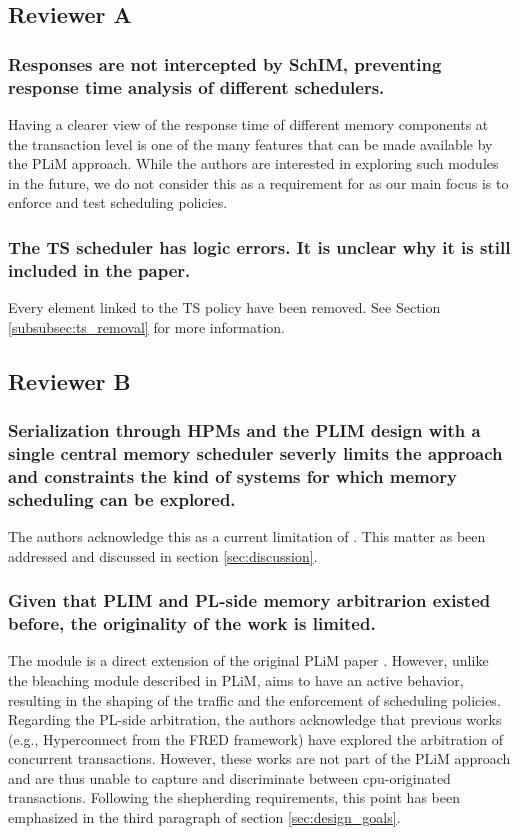     \subsection{Reviewer A}
        \subsubsection{Responses are not intercepted by SchIM, preventing response time analysis of different schedulers.}
            Having a clearer view of the response time of different memory components at the transaction level is one of the many features that can be made available by the PLiM approach. While the authors are interested in exploring such modules in the future, we do not consider this as a requirement for \schim as our main focus is to enforce and test scheduling policies.

        \subsubsection{The TS scheduler has logic errors. It is unclear why it is still included in the paper.}
            Every element linked to the TS policy have been removed. See Section \ref{subsubsec:ts_removal} for more information.

    \subsection{Reviewer B}
        \subsubsection{Serialization through HPMs and the PLIM design with a single central memory scheduler severly limits the approach and constraints the kind of systems for which memory scheduling can be explored.}
            The authors acknowledge this as a current limitation of \schim. This matter as been addressed and discussed in section \ref{sec:discussion}.

        \subsubsection{Given that PLIM and PL-side memory arbitrarion existed before, the originality of the work is limited.}
            The \schim module is a direct extension of the original PLiM paper \cite{PLIM20}. However, unlike the bleaching module described in PLiM, \schim aims to have an active behavior, resulting in the shaping of the traffic and the enforcement of scheduling policies.
            Regarding the PL-side arbitration, the authors acknowledge that previous works (e.g., Hyperconnect from the FRED framework) have explored the arbitration of concurrent transactions. However, these works are not part of the PLiM approach and are thus unable to capture and discriminate between cpu-originated transactions.
            Following the shepherding requirements, this point has been emphasized in the third paragraph of section \ref{sec:design_goals}.

